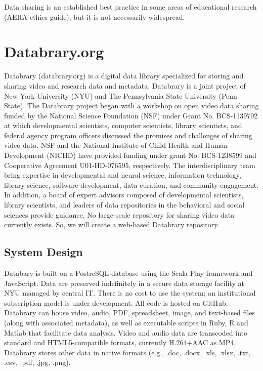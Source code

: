 \documentclass[letterpaper,man,apacite]{apa6}
\begin{document}
Data sharing is an established best practice in some areas of educational research (AERA ethics guide), but it is not necessarily widespread.

\section{Databrary.org}
Databrary (databrary.org) is a digital data library specialized for storing and sharing video and research data and metadata.
Databrary is a joint project of New York University (NYU) and The Pennsylvania State University (Penn State). 
The Databrary project began with a workshop on open video data sharing funded by the National
Science Foundation (NSF) under Grant No. BCS-1139702 at which developmental scientists, computer scientists, library scientists, and federal agency program officers discussed the promises and challenges of
sharing video data. 
NSF and the National Institute of Child Health and Human Development (NICHD) have provided funding under grant No. BCS-1238599 and Cooperative Agreement U01-HD-076595, respectively. 
The interdisciplinary team bring expertise in developmental and neural
science, information technology, library science, software development,
data curation, and community engagement. 
In addition, a board of expert
advisors composed of developmental scientists, library scientists, and
leaders of data repositories in the behavioral and social sciences
provide guidance.
No large-scale repository for sharing video data currently exists. So, we will create a web-based Databrary repository. 

\subsection{System Design}

Databary is built on a PostreSQL database using the Scala Play framework and JavaScript.
Data are preserved indefinitely in a secure data storage facility at NYU managed by central IT.
There is no cost to use the system; an institutional subscription model is under development.
All code is hosted on GitHub.
Databrary can house video, audio, PDF, spreadsheet, image, and text-based files (along with associated metadata), as well as executable scripts in Ruby, R and Matlab that facilitate data analysis.
Video and audio data are transcoded into standard and HTML5-compatible formats, currently H.264+AAC as MP4. Databrary stores other data in native formats (e.g., .doc, .docx, .xls, .xlsx, .txt, .csv, .pdf, .jpg, .png).
\end{document}
